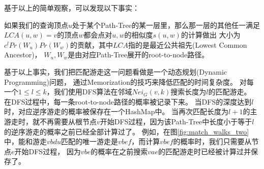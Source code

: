 \documentclass[master]{njuthesis}
\begin{document}
基于以上的简单观察，可以发现以下事实：
\begin{fact}
如果我们的查询顶点$u$处于某个Path-Tree的某一层里，那么那一层的其他任一满足$LCA(u, w)=v$的顶点$w$都会点对$u,w$的相似度$s(u,w)$的计算做出
大小为$c^{l}Pr(W_u)Pr(W_w)$的贡献，其中$LCA$指的是最近公共祖先(Lowest Common Ancestor)，
$W_u, W_w$是由对应Path-Tree展开的root-to-node路径。
\end{fact}
基于以上事实，我们把匹配游走这一问题看做是一个动态规划(Dynamic Programming)问题，
通过Memorization的技巧来降低匹配的时间复杂度。
对每一个$1 \leq l \leq k$，我们使用DFS算法在邻域$Nei_G(v,k)$搜索长度为$l$的匹配游走。
在DFS过程中，每一条root-to-node路径的概率被记录下来。
当DFS的深度达到$l$时，对应逆序游走的概率被保存在一个HashMap中。
当再次匹配长度为$l+1$的主游走时，就不再需要从根节点$v$开始DFS过程，因为该Path-Tree中长度小于等于$l$的逆序游走的概率之前已经全部计算过了。
例如，在图\ref{fig:match_walks_two}中，能和游走$vbdu$匹配的唯一游走是$vbef$，而计算$vbef$的概率时，我们只需要从节点$e$开始DFS过程，
因为$vbe$的概率在之前搜索$vae$的匹配游走时已经被计算过并保存了。
\end{document}
